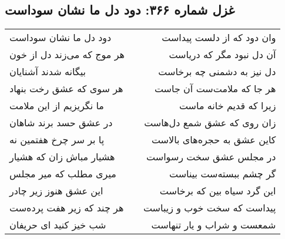 \begin{center}
\section*{غزل شماره ۳۶۶: دود دل ما نشان سوداست}
\label{sec:0366}
\begin{longtable}{l p{0.5cm} r}
دود دل ما نشان سوداست
&&
وان دود که از دلست پیداست
\\
هر موج که می‌زند دل از خون
&&
آن دل نبود مگر که دریاست
\\
بیگانه شدند آشنایان
&&
دل نیز به دشمنی چه برخاست
\\
هر سوی که عشق رخت بنهاد
&&
هر جا که ملامت‌ست آن جاست
\\
ما نگریزیم از این ملامت
&&
زیرا که قدیم خانه ماست
\\
در عشق حسد برند شاهان
&&
زان روی که عشق شمع دل‌هاست
\\
پا بر سر چرخ هفتمین نه
&&
کاین عشق به حجره‌های بالاست
\\
هشیار مباش زان که هشیار
&&
در مجلس عشق سخت رسواست
\\
میری مطلب که میر مجلس
&&
گر چشم ببسته‌ست بیناست
\\
این عشق هنوز زیر چادر
&&
این گرد سیاه بین که برخاست
\\
هر چند که زیر هفت پرده‌ست
&&
پیداست که سخت خوب و زیباست
\\
شب خیز کنید ای حریفان
&&
شمعست و شراب و یار تنهاست
\\
\end{longtable}
\end{center}
